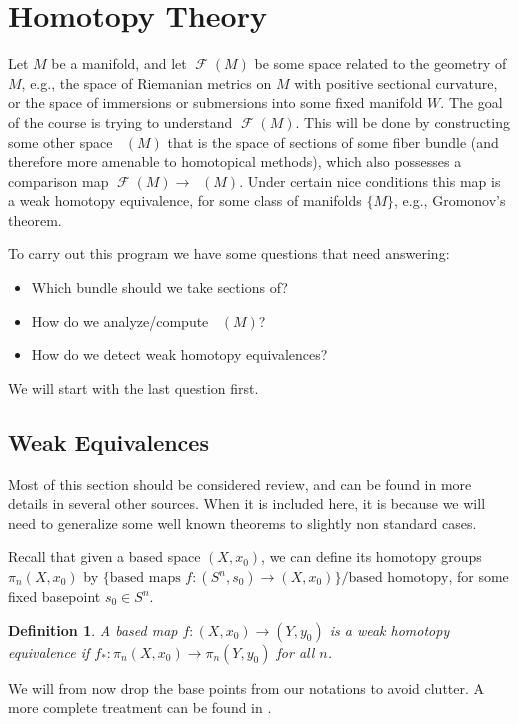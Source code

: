 \documentclass{article}
\newtheorem{definition}[theorem]{Definition}
\newtheorem{proposed work}[theorem]{Proposed Work}
\DeclareMathOperator{\CF}{\mathcal F}
\DeclareMathOperator{\CFh}{\mathcal{F}^{h}} %
\begin{document}
\section{Homotopy Theory}
Let $M$ be a manifold, and let $\CF(M)$ be some space related to the geometry of $M$, e.g., the space of Riemanian metrics on $M$ with positive sectional curvature, or the space of immersions or submersions into some fixed manifold $W$. The goal of the course is trying to understand $\CF(M)$. This will be done by constructing some other space $\CFh(M)$ that is the space of sections of some fiber bundle (and therefore more amenable to homotopical methods), which also possesses a comparison map $\CF(M)\to \CFh(M)$. Under certain nice conditions this map is a weak homotopy equivalence, for some class of manifolds $\{M\}$, e.g., Gromonov's theorem.

To carry out this program we have some questions that need answering:
\begin{itemize}
\item Which bundle should we take sections of?
\item How do we analyze/compute $\CFh(M)$?
\item How do we detect weak homotopy equivalences? 
\end{itemize} 
We will start with the last question first.

\subsection{Weak Equivalences}
Most of this section should be considered review, and can be found in more details in several other sources. When it is included here, it is because we will need to generalize some well known theorems to slightly non standard cases.

Recall that given a based space $(X,x_0)$, we can define its homotopy groups $\pi_n(X,x_0)$ by $\{\text{based maps }f:(S^n,s_0)\to (X,x_0)\}/\text{based homotopy}$, for some fixed basepoint $s_0\in S^n$. 
\begin{definition}
A based map $f:(X,x_0)\to (Y,y_0)$ is a weak homotopy equivalence if $f_*:\pi_n(X,x_0)\to \pi_n(Y,y_0)$ for all $n$.
\end{definition}
We will from now drop the base points from our notations to avoid clutter. A more complete treatment can be found in \cite{may1999concise}.
\end{document}
